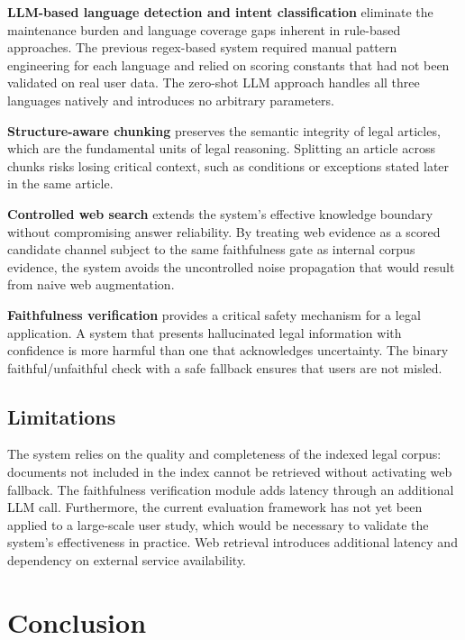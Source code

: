 \documentclass[12pt, a4paper]{article}
\begin{document}
\textbf{LLM-based language detection and intent classification} eliminate the
maintenance burden and language coverage gaps inherent in rule-based approaches.
The previous regex-based system required manual pattern engineering for each
language and relied on scoring constants that had not been validated on real
user data. The zero-shot LLM approach handles all three languages natively and
introduces no arbitrary parameters.

\textbf{Structure-aware chunking} preserves the semantic integrity of legal
articles, which are the fundamental units of legal reasoning. Splitting an
article across chunks risks losing critical context, such as conditions or
exceptions stated later in the same article.

\textbf{Controlled web search} extends the system's effective knowledge
boundary without compromising answer reliability. By treating web evidence
as a scored candidate channel subject to the same faithfulness gate as
internal corpus evidence, the system avoids the uncontrolled noise
propagation that would result from naive web augmentation.

\textbf{Faithfulness verification} provides a critical safety mechanism for
a legal application. A system that presents hallucinated legal information
with confidence is more harmful than one that acknowledges uncertainty.
The binary faithful/unfaithful check with a safe fallback ensures that users
are not misled.

\subsection{Limitations}

The system relies on the quality and completeness of the indexed legal corpus:
documents not included in the index cannot be retrieved without activating
web fallback. The faithfulness verification module adds latency through an
additional LLM call. Furthermore, the current evaluation framework has not
yet been applied to a large-scale user study, which would be necessary to
validate the system's effectiveness in practice. Web retrieval introduces
additional latency and dependency on external service availability.

\section{Conclusion}
\end{document}
